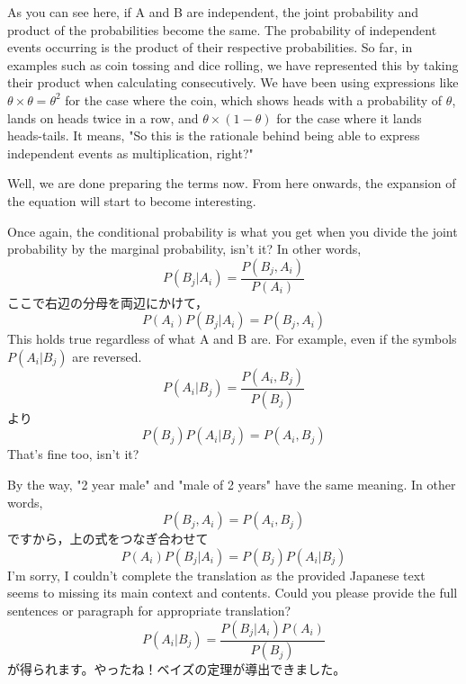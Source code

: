 \documentclass{ltjsbook}
\begin{document}
As you can see here, if A and B are independent, the joint probability and product of the probabilities become the same. The probability of independent events occurring is the product of their respective probabilities. So far, in examples such as coin tossing and dice rolling, we have represented this by taking their product when calculating consecutively.
We have been using expressions like $\theta \times \theta = \theta^2$ for the case where the coin, which shows heads with a probability of $\theta$, lands on heads twice in a row, and $\theta \times (1-\theta)$ for the case where it lands heads-tails.
It means, "So this is the rationale behind being able to express independent events as multiplication, right?"


Well, we are done preparing the terms now. From here onwards, the expansion of the equation will start to become interesting.

Once again, the conditional probability is what you get when you divide the joint probability by the marginal probability, isn't it? In other words,
\[ P(B_j | A_i) = \frac{P(B_j,A_i)}{P(A_i)} \]
ここで右辺の分母を両辺にかけて，
\[ P(A_i)P(B_j|A_i) = P(B_j,A_i) \]
This holds true regardless of what A and B are. For example, even if the symbols $P(A_i|B_j)$ are reversed.
\[ P(A_i|B_j) = \frac{P(A_i,B_j)}{P(B_j)} \]
より
\[P(B_j)P(A_i|B_j) = P(A_i,B_j) \]
That's fine too, isn't it?


By the way, "2 year male" and "male of 2 years" have the same meaning. In other words,
\[P(B_j,A_i) = P(A_i, B_j) \]
ですから，上の式をつなぎ合わせて
\[P(A_i)P(B_j|A_i) = P(B_j)P(A_i|B_j) \]
I'm sorry, I couldn't complete the translation as the provided Japanese text seems to missing its main context and contents. Could you please provide the full sentences or paragraph for appropriate translation?
\[ P(A_i | B_j )=\frac{P(B_j|A_i)P(A_i)}{P(B_j)} \]
が得られます。やったね！ベイズの定理が導出できました。
\end{document}
